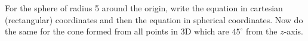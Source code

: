 For the sphere of radius 5 around the origin, write the equation in cartesian (rectangular) coordinates and then the equation in spherical coordinates.  Now do the same for the cone formed from all points in 3D which are $45^\circ$ from the $z$-axis.

